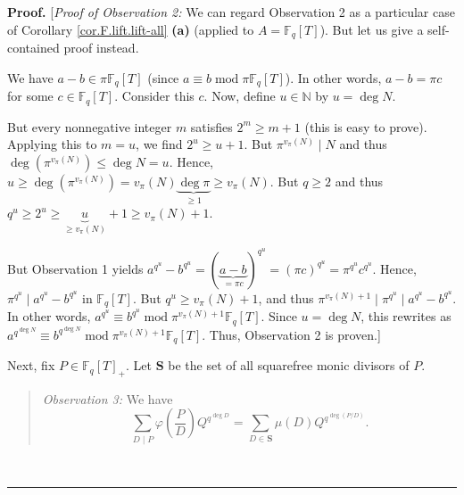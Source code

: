 \documentclass[numbers=enddot,12pt,final,onecolumn,notitlepage]{scrartcl}%
\theoremstyle{definition}
\newenvironment{statement}{\begin{quote}}{\end{quote}}
\newenvironment{proof}[1][Proof]{\noindent\textbf{#1.} }{\ \rule{0.5em}{0.5em}}
\let\sumnonlimits\sum
\renewcommand{\sum}{\sumnonlimits\limits}
\begin{document}
\begin{proof}
[\textit{Proof of Observation 2:} We can regard Observation 2 as a particular
case of Corollary \ref{cor.F.lift.lift-all} \textbf{(a)} (applied to
$A=\mathbb{F}_{q}\left[  T\right]  $). But let us give a self-contained proof instead.

We have $a-b\in\pi\mathbb{F}_{q}\left[  T\right]  $ (since $a\equiv
b\operatorname{mod}\pi\mathbb{F}_{q}\left[  T\right]  $). In other words,
$a-b=\pi c$ for some $c\in\mathbb{F}_{q}\left[  T\right]  $. Consider this
$c$. Now, define $u\in\mathbb{N}$ by $u=\deg N$.

But every nonnegative integer $m$ satisfies $2^{m}\geq m+1$ (this is easy to
prove). Applying this to $m=u$, we find $2^{u}\geq u+1$. But $\pi^{v_{\pi
}\left(  N\right)  }\mid N$ and thus $\deg\left(  \pi^{v_{\pi}\left(
N\right)  }\right)  \leq\deg N=u$. Hence, $u\geq\deg\left(  \pi^{v_{\pi
}\left(  N\right)  }\right)  =v_{\pi}\left(  N\right)  \underbrace{\deg\pi
}_{\geq1}\geq v_{\pi}\left(  N\right)  $. But $q\geq2$ and thus $q^{u}%
\geq2^{u}\geq\underbrace{u}_{\geq v_{\pi}\left(  N\right)  }+1\geq v_{\pi
}\left(  N\right)  +1$.

But Observation 1 yields $a^{q^{u}}-b^{q^{u}}=\left(  \underbrace{a-b}_{=\pi
c}\right)  ^{q^{u}}=\left(  \pi c\right)  ^{q^{u}}=\pi^{q^{u}}c^{q^{u}}$.
Hence, $\pi^{q^{u}}\mid a^{q^{u}}-b^{q^{u}}$ in $\mathbb{F}_{q}\left[
T\right]  $. But $q^{u}\geq v_{\pi}\left(  N\right)  +1$, and thus
$\pi^{v_{\pi}\left(  N\right)  +1}\mid\pi^{q^{u}}\mid a^{q^{u}}-b^{q^{u}}$. In
other words, $a^{q^{u}}\equiv b^{q^{u}}\operatorname{mod}\pi^{v_{\pi}\left(
N\right)  +1}\mathbb{F}_{q}\left[  T\right]  $. Since $u=\deg N$, this
rewrites as $a^{q^{\deg N}}\equiv b^{q^{\deg N}}\operatorname{mod}\pi^{v_{\pi
}\left(  N\right)  +1}\mathbb{F}_{q}\left[  T\right]  $. Thus, Observation 2
is proven.]

Next, fix $P\in\mathbb{F}_{q}\left[  T\right]  _{+}$. Let $\mathbf{S}$ be the
set of all squarefree monic divisors of $P$.

\begin{statement}
\textit{Observation 3:} We have%
\[
\sum_{D\mid P}\varphi\left(  \dfrac{P}{D}\right)  Q^{q^{\deg D}}=\sum
_{D\in\mathbf{S}}\mu\left(  D\right)  Q^{q^{\deg\left(  P/D\right)  }}.
\]

\end{statement}


\end{proof}
\end{document}
